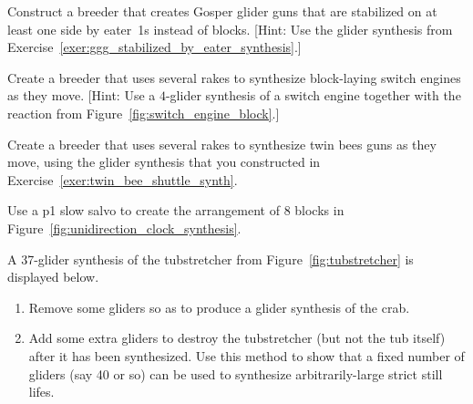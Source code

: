 \begin{multicols}{2}
\begin{problem}\label{exer:ggg_eater_side_breeder}
	Construct a breeder that creates Gosper glider guns that are stabilized on at least one side by eater~1s instead of blocks. [Hint: Use the glider synthesis from Exercise~\ref{exer:ggg_stabilized_by_eater_synthesis}.]
\end{problem}


\mfilbreak


\begin{problem}\label{exer:block_laying_switch_breeder}
	Create a breeder that uses several rakes to synthesize block-laying switch engines as they move. [Hint: Use a $4$-glider synthesis of a switch engine together with the reaction from Figure~\ref{fig:switch_engine_block}.]
\end{problem}


\mfilbreak


\begin{problem}\label{exer:new_gun_breeder}
	Create a breeder that uses several rakes to synthesize twin bees guns as they move, using the glider synthesis that you constructed in Exercise~\ref{exer:twin_bee_shuttle_synth}.
\end{problem}


\mfilbreak


\begin{problem}\label{exer:slow_salvo_8_blocks}
	Use a p1 slow salvo to create the arrangement of $8$ blocks in Figure~\ref{fig:unidirection_clock_synthesis}.
\end{problem}


\mfilbreak


\begin{problem}\label{exer:large_still_life_synth}
	A 37-glider synthesis of the tubstretcher from Figure~\ref{fig:tubstretcher} is displayed below.
	\begin{center}
	\end{center}
	\begin{enumerate}[label=(\alph*)]
		\item Remove some gliders so as to produce a glider synthesis of the crab.
		
		\item Add some extra gliders to destroy the tubstretcher (but not the tub itself) after it has been synthesized. Use this method to show that a fixed number of gliders (say 40 or so) can be used to synthesize arbitrarily-large strict still lifes.
	\end{enumerate}
\end{problem}



\end{multicols}
